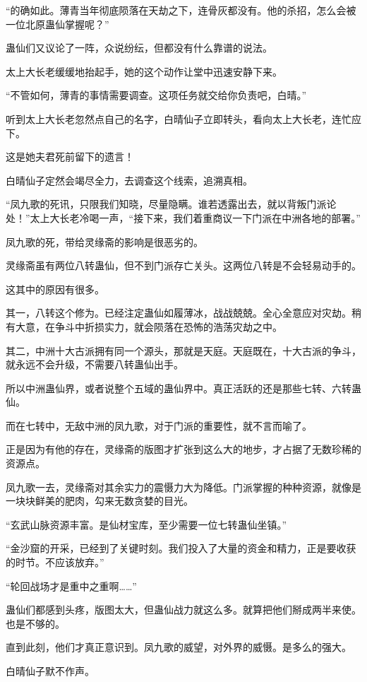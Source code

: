 \begin{this_body}
“的确如此。薄青当年彻底陨落在天劫之下，连骨灰都没有。他的杀招，怎么会被一位北原蛊仙掌握呢？”

蛊仙们又议论了一阵，众说纷纭，但都没有什么靠谱的说法。

太上大长老缓缓地抬起手，她的这个动作让堂中迅速安静下来。

“不管如何，薄青的事情需要调查。这项任务就交给你负责吧，白晴。”

听到太上大长老忽然点自己的名字，白晴仙子立即转头，看向太上大长老，连忙应下。

这是她夫君死前留下的遗言！

白晴仙子定然会竭尽全力，去调查这个线索，追溯真相。

“凤九歌的死讯，只限我们知晓，尽量隐瞒。谁若透露出去，就以背叛门派论处！”太上大长老冷喝一声，“接下来，我们着重商议一下门派在中洲各地的部署。”

凤九歌的死，带给灵缘斋的影响是很恶劣的。

灵缘斋虽有两位八转蛊仙，但不到门派存亡关头。这两位八转是不会轻易动手的。

这其中的原因有很多。

其一，八转这个修为。已经注定蛊仙如履薄冰，战战兢兢。全心全意应对灾劫。稍有大意，在争斗中折损实力，就会陨落在恐怖的浩荡灾劫之中。

其二，中洲十大古派拥有同一个源头，那就是天庭。天庭既在，十大古派的争斗，就永远不会升级，不需要八转蛊仙出手。

所以中洲蛊仙界，或者说整个五域的蛊仙界中。真正活跃的还是那些七转、六转蛊仙。

而在七转中，无敌中洲的凤九歌，对于门派的重要性，就不言而喻了。

正是因为有他的存在，灵缘斋的版图才扩张到这么大的地步，才占据了无数珍稀的资源点。

凤九歌一去，灵缘斋对其余实力的震慑力大为降低。门派掌握的种种资源，就像是一块块鲜美的肥肉，勾来无数贪婪的目光。

“玄武山脉资源丰富。是仙材宝库，至少需要一位七转蛊仙坐镇。”

“金沙窟的开采，已经到了关键时刻。我们投入了大量的资金和精力，正是要收获的时节。不应该放弃。”

“轮回战场才是重中之重啊……”

蛊仙们都感到头疼，版图太大，但蛊仙战力就这么多。就算把他们掰成两半来使。也是不够的。

直到此刻，他们才真正意识到。凤九歌的威望，对外界的威慑。是多么的强大。

白晴仙子默不作声。


\end{this_body}
